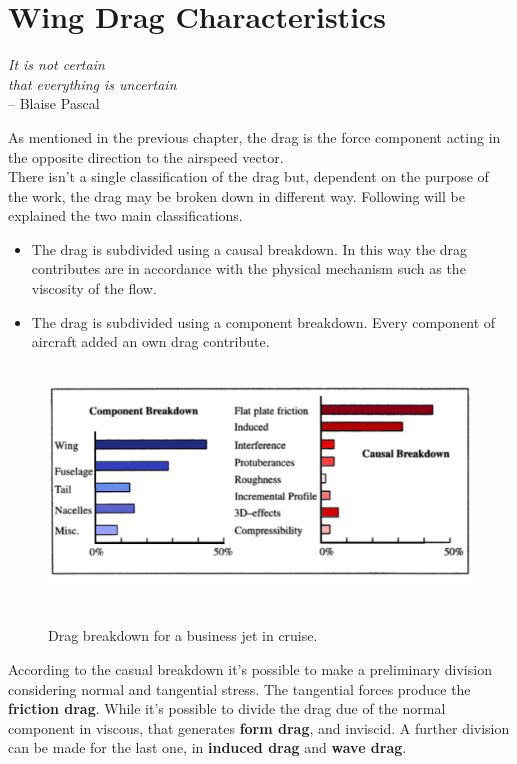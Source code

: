 \chapter{Wing Drag Characteristics}

\label{ch:wingdrag}

\begin{flushright}
	{\smaller
		\textit{It is not certain\\ that everything is uncertain}\\
		-- Blaise Pascal}
\end{flushright}


As mentioned in the previous chapter, the drag is the force component acting in the opposite direction to the airspeed vector.\\
There isn't a single classification of the drag but, dependent on the purpose of the work, the drag may be broken down in different way. Following will be explained the two main classifications.

\begin{itemize}
\item The drag is subdivided using a causal breakdown. In this way the drag contributes are in accordance with the physical mechanism such as the viscosity of the flow.
\item The drag is subdivided using a component breakdown. Every component of aircraft added an own drag contribute.
\end{itemize}

\begin{figure}[H]
\centering
{\includegraphics[height=6.4cm]{Immagini/component.png}} 
\caption{Drag breakdown for a business jet in cruise.}
\end{figure}

According to the casual breakdown it's possible to make a preliminary division considering normal and tangential stress. The tangential forces produce the {\bfseries friction drag}. While it's possible to divide the drag due of the normal component in viscous, that generates {\bfseries form drag}, and inviscid. A further division can be made for the last one, in {\bfseries induced drag}  and {\bfseries wave drag}.\\

